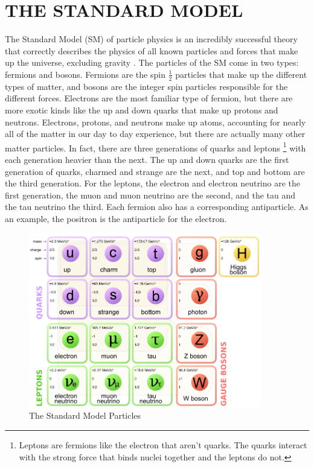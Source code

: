 \chapter{THE STANDARD MODEL} \label{sm}

The Standard Model (SM) of particle physics is an incredibly successful theory that correctly describes the physics of all known particles and forces that make up the universe, excluding gravity \cite{smconsistency}. The particles of the SM come in two types: fermions and bosons. Fermions are the spin $\frac{1}{2}$ particles that make up the different types of matter, and bosons are the integer spin particles responsible for the different forces. Electrons are the most familiar type of fermion, but there are more exotic kinds like the up and down quarks that make up protons and neutrons. Electrons, protons, and neutrons make up atoms, accounting for nearly all of the matter in our day to day experience, but there are actually many other matter particles. In fact, there are three generations of quarks and leptons \footnote{Leptons are fermions like the electron that aren't quarks. The quarks interact with the strong force that binds nuclei together and the leptons do not.} with each generation heavier than the next. The up and down quarks are the first generation of quarks, charmed and strange are the next, and top and bottom are the third generation. For the leptons, the electron and electron neutrino are the first generation, the muon and muon neutrino are the second, and the tau and the tau neutrino the third. Each fermion also has a corresponding antiparticle. As an example, the positron is the antiparticle for the electron. 

\begin{figure}[h!]
  \centering
  \includegraphics[width=4in]{images/Standard_Model_of_Elementary_Particles.png}
  \caption
   {The Standard Model Particles}
  \label{fig:smtable}
\end{figure}

